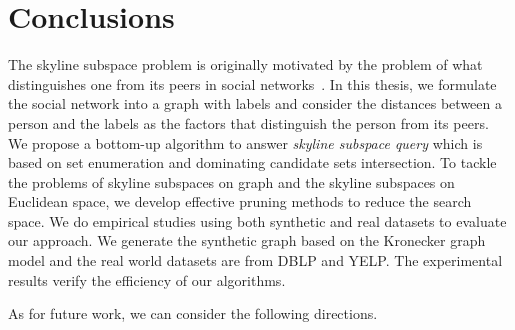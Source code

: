 
%
%

\chapter{Conclusions}
\label{ch:con}

The skyline subspace problem is originally motivated by the problem of what distinguishes one from its peers in social networks~\cite{lo2013distinguish}. In this thesis, we formulate the social network into a graph with labels and consider the distances between a person and the labels as the factors that distinguish the person from its peers. We propose a bottom-up algorithm to answer \emph{skyline subspace query} which is based on set enumeration and dominating candidate sets intersection. To tackle the problems of skyline subspaces on graph and the skyline subspaces on Euclidean space, we develop effective pruning methods to reduce the search space. 
We do empirical studies using both synthetic and real datasets to evaluate our approach. We generate the synthetic graph based on the Kronecker graph model and the real world datasets are from DBLP and YELP. The experimental results verify the efficiency of our algorithms.

As for future work, we can consider the following directions.  

